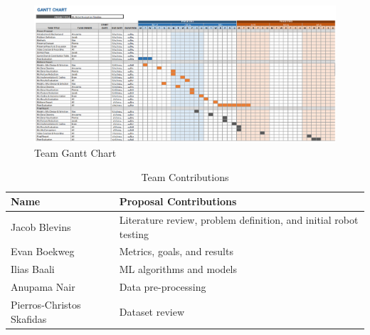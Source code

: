 \documentclass{article}
\begin{document}
\begin{figure}[htp]
    \centering
    \includegraphics[width=1.0\textwidth]{figs/gantt.png} %
    \caption{Team Gantt Chart}
    \label{fig:gantt}
\end{figure}

\begin{table}[ht]
    \centering
        \caption{Team Contributions}
    \label{tab:contributions}
    \begin{tabular}{|l|p{10cm}|}
        \hline
        \textbf{Name} & \textbf{Proposal Contributions} \\
        \hline
        Jacob Blevins & Literature review, problem definition, and initial robot testing \\
        \hline
        Evan Boekweg & Metrics, goals, and results \\
        \hline
        Ilias Baali & ML algorithms and models \\
        \hline
        Anupama Nair & Data pre-processing \\
        \hline
        Pierros-Christos Skafidas & Dataset review \\
        \hline
    \end{tabular}
\end{table}
\newpage


\end{document}
